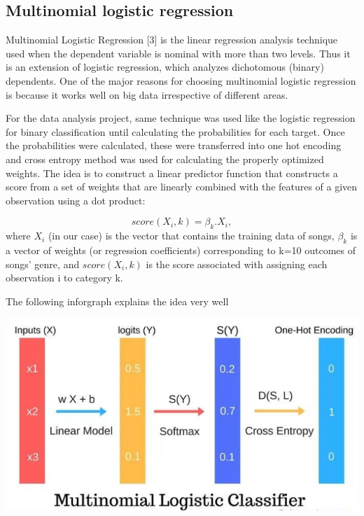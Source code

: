 \documentclass[journal]{IEEEtran}
\begin{document}
\subsection{Multinomial logistic regression}
Multinomial Logistic Regression [3] is the linear regression analysis technique used when the dependent variable is nominal with more than two levels. Thus it is an extension of logistic regression, which analyzes dichotomous (binary) dependents. One of the major reasons for choosing multinomial logistic regression is because it works well on big data irrespective of different areas. \par
For the data analysis project, same technique was used like the logistic regression for binary classification until calculating the probabilities for each target. Once the probabilities were calculated, these were transferred into one hot encoding and cross entropy method was used for calculating the properly optimized weights. The idea is to construct a linear predictor function that constructs a score from a set of weights that are linearly combined with the features of a given observation using a dot product: \par
\begin{equation}
	score(X_i,k) = \beta_k . X_i,
\end{equation}
where $X_i$ (in our case) is the vector that contains the training data of songs, $\beta_k$ is a vector of weights (or regression coefficients) corresponding to k=10 outcomes of songs' genre, and $score(X_i, k)$ is the score associated with assigning each observation i to category k. \par
The following inforgraph explains the idea very well \par
\begin{center}
	\includegraphics[width=\columnwidth]{images/how_it_works.png}
\end{center}
\end{document}
